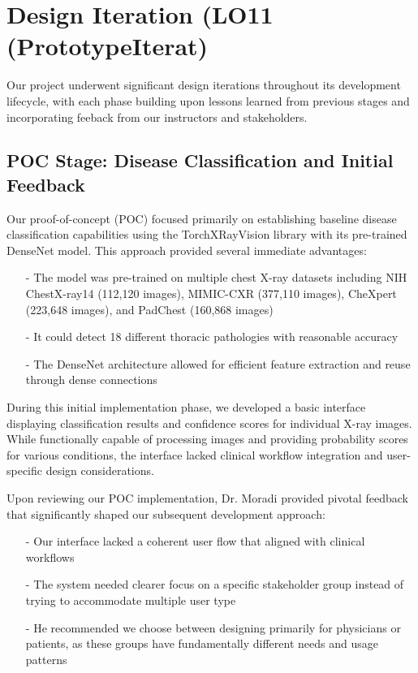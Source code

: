 \documentclass{article}
\begin{document}
\section{Design Iteration (LO11 (PrototypeIterat)}

Our project underwent significant design iterations throughout its development lifecycle, with each phase building upon lessons learned from previous stages and incorporating feeback from our instructors and stakeholders.

\subsection{POC Stage: Disease Classification and Initial Feedback}

Our proof-of-concept (POC) focused primarily on establishing baseline disease classification capabilities using the TorchXRayVision library with its pre-trained DenseNet model. This approach provided several immediate advantages:

\begin{itemize}
    \item[-] The model was pre-trained on multiple chest X-ray datasets including NIH ChestX-ray14 (112,120 images), MIMIC-CXR (377,110 images), CheXpert (223,648 images), and PadChest (160,868 images)
    \item[-] It could detect 18 different thoracic pathologies with reasonable accuracy
    \item[-] The DenseNet architecture allowed for efficient feature extraction and reuse through dense connections
\end{itemize}

\noindent During this initial implementation phase, we developed a basic interface displaying classification results and confidence scores for individual X-ray images. While functionally capable of processing images and providing probability scores for various conditions, the interface lacked clinical workflow integration and user-specific design considerations.

\noindent Upon reviewing our POC implementation, Dr. Moradi provided pivotal feedback that significantly shaped our subsequent development approach:

\begin{itemize}
    \item[-] Our interface lacked a coherent user flow that aligned with clinical workflows
    \item[-] The system needed clearer focus on a specific stakeholder group instead of trying to accommodate multiple user type
    \item[-] He recommended we choose between designing primarily for physicians or patients, as these groups have fundamentally different needs and usage patterns
\end{itemize}
\end{document}
